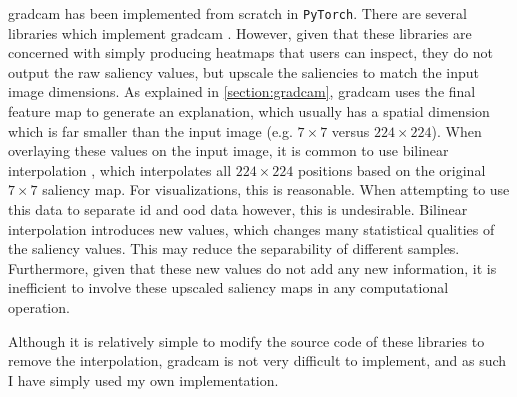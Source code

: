 \documentclass[UKenglish]{uiomasterthesis} %
\theoremstyle{definition}
\begin{document}
\ac{gradcam} has been implemented from scratch in \texttt{PyTorch}. There are several libraries which implement \ac{gradcam} \cite{jacobgilpytorchcam, captum}. However, given that these libraries are concerned with simply producing heatmaps that users can inspect, they do not output the raw saliency values, but upscale the saliencies to match the input image dimensions. As explained in \ref{section:gradcam}, \ac{gradcam} uses the final feature map to generate an explanation, which usually has a spatial dimension which is far smaller than the input image (e.g. $7 \times 7$ versus $224 \times 224$). When overlaying these values on the input image, it is common to use bilinear interpolation \cite{jacobgilpytorchcam}, which interpolates all $224 \times 224$ positions based on the original $7 \times 7$ saliency map. For visualizations, this is reasonable. When attempting to use this data to separate \ac{id} and \ac{ood} data however, this is undesirable. Bilinear interpolation introduces new values, which changes many statistical qualities of the saliency values. This may reduce the separability of different samples. Furthermore, given that these new values do not add any new information, it is inefficient to involve these upscaled saliency maps in any computational operation.

Although it is relatively simple to modify the source code of these libraries to remove the interpolation, \ac{gradcam} is not very difficult to implement, and as such I have simply used my own implementation.
\end{document}
